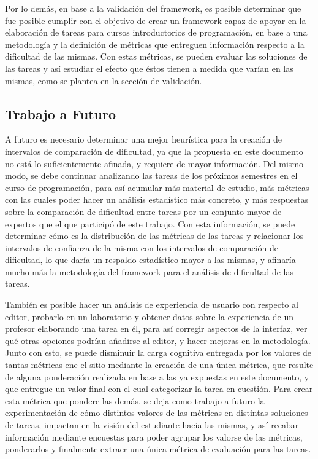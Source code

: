 \documentclass[letterpaper,12pt]{article}
\begin{document}
Por lo demás, en base a la validación del framework, es posible determinar que fue posible cumplir con el objetivo de crear un framework capaz de apoyar en la elaboración de tareas para cursos introductorios de programación, en base a una metodología y la definición de métricas que entreguen información respecto a la dificultad de las mismas. Con estas métricas, se pueden evaluar las soluciones de las tareas y así estudiar el efecto que éstos tienen a medida que varían en las mismas, como se plantea en la sección de validación.

\subsection{Trabajo a Futuro}

A futuro es necesario determinar una mejor heurística para la creación de intervalos de comparación de dificultad, ya que la propuesta en este documento no está lo suficientemente afinada, y requiere de mayor información. Del mismo modo, se debe continuar analizando las tareas de los próximos semestres en el curso de programación, para así acumular más material de estudio, más métricas con las cuales poder hacer un análisis estadístico más concreto, y más respuestas sobre la comparación de dificultad entre tareas por un conjunto mayor de expertos que el que participó de este trabajo. Con esta información, se puede determinar cómo es la distribución de las métricas de las tareas y relacionar los intervalos de confianza de la misma con los intervalos de comparación de dificultad, lo que daría un respaldo estadístico mayor a las mismas, y afinaría mucho más la metodología del framework para el análisis de dificultad de las tareas.

También es posible hacer un análisis de experiencia de usuario con respecto al editor, probarlo en un laboratorio y obtener datos sobre la experiencia de un profesor elaborando una tarea en él, para así corregir aspectos de la interfaz, ver qué otras opciones podrían añadirse al editor, y hacer mejoras en la metodología. Junto con esto, se puede disminuir la carga cognitiva entregada por los valores de tantas métricas ene el sitio mediante la creación de una única métrica, que resulte de alguna ponderación realizada en base a las ya expuestas en este documento, y que entregue un valor final con el cual categorizar la tarea en cuestión. Para crear esta métrica que pondere las demás, se deja como trabajo a futuro la experimentación de cómo distintos valores de las métricas en distintas soluciones de tareas, impactan en la visión del estudiante hacia las mismas, y así recabar información mediante encuestas para poder agrupar los valorse de las métricas, ponderarlos y finalmente extraer una única métrica de evaluación para las tareas.

\newpage

{}
\end{document}
